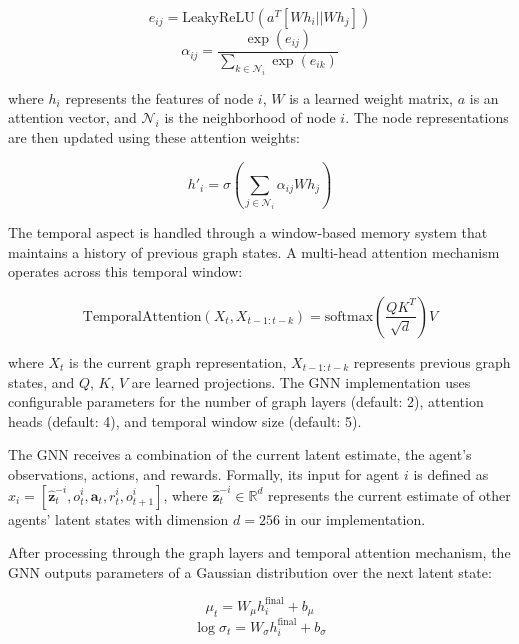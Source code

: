 \begin{equation}
    e_{ij} = \text{LeakyReLU}(a^T[Wh_i || Wh_j])
\end{equation}
\begin{equation}
    \alpha_{ij} = \frac{\exp(e_{ij})}{\sum_{k \in \mathcal{N}_i} \exp(e_{ik})}
\end{equation}

where $h_i$ represents the features of node $i$, $W$ is a learned weight matrix, $a$ is an attention vector, and $\mathcal{N}_i$ is the neighborhood of node $i$. The node representations are then updated using these attention weights:

\begin{equation}
    h'_i = \sigma\left(\sum_{j \in \mathcal{N}_i} \alpha_{ij} W h_j\right)
\end{equation}

The temporal aspect is handled through a window-based memory system that maintains a history of previous graph states. A multi-head attention mechanism operates across this temporal window:

\begin{equation}
    \text{TemporalAttention}(X_t, X_{t-1:t-k}) = \text{softmax}\left(\frac{QK^T}{\sqrt{d}}\right)V
\end{equation}

where $X_t$ is the current graph representation, $X_{t-1:t-k}$ represents previous graph states, and $Q$, $K$, $V$ are learned projections. The GNN implementation uses configurable parameters for the number of graph layers (default: 2), attention heads (default: 4), and temporal window size (default: 5).

The GNN receives a combination of the current latent estimate, the agent's observations, actions, and rewards. Formally, its input for agent $i$ is defined as $x_i = [\hat{\boldsymbol{z}}^{-i}_{t}, o^{i}_{t}, \boldsymbol{a}_{t}, r^{i}_{t}, o^{i}_{t+1}]$, where $\hat{\boldsymbol{z}}^{-i}_{t} \in \mathbb{R}^{d}$ represents the current estimate of other agents' latent states with dimension $d=256$ in our implementation.

After processing through the graph layers and temporal attention mechanism, the GNN outputs parameters of a Gaussian distribution over the next latent state:

\begin{equation}
    \mu_{t} = W_{\mu}h^{\text{final}}_i + b_{\mu}
\end{equation}
\begin{equation}
    \log\sigma_{t} = W_{\sigma}h^{\text{final}}_i + b_{\sigma}
\end{equation}

